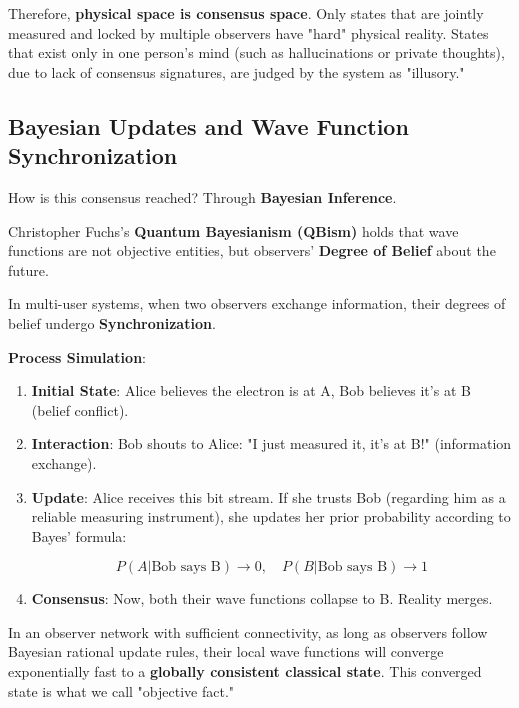Therefore, \textbf{physical space is consensus space}. Only states that are jointly measured and locked by multiple observers have "hard" physical reality. States that exist only in one person's mind (such as hallucinations or private thoughts), due to lack of consensus signatures, are judged by the system as "illusory."

\subsection{Bayesian Updates and Wave Function Synchronization}

How is this consensus reached? Through \textbf{Bayesian Inference}.

Christopher Fuchs's \textbf{Quantum Bayesianism (QBism)} holds that wave functions are not objective entities, but observers' \textbf{Degree of Belief} about the future.

In multi-user systems, when two observers exchange information, their degrees of belief undergo \textbf{Synchronization}.

\textbf{Process Simulation}:

\begin{enumerate}
\item \textbf{Initial State}: Alice believes the electron is at A, Bob believes it's at B (belief conflict).

\item \textbf{Interaction}: Bob shouts to Alice: "I just measured it, it's at B!" (information exchange).

\item \textbf{Update}: Alice receives this bit stream. If she trusts Bob (regarding him as a reliable measuring instrument), she updates her prior probability according to Bayes' formula:

    \begin{equation}
    P(A|\text{Bob says B}) \to 0, \quad P(B|\text{Bob says B}) \to 1
    \end{equation}

\item \textbf{Consensus}: Now, both their wave functions collapse to B. Reality merges.
\end{enumerate}

\begin{theorem}
In an observer network with sufficient connectivity, as long as observers follow Bayesian rational update rules, their local wave functions will converge exponentially fast to a \textbf{globally consistent classical state}. This converged state is what we call "objective fact."
\end{theorem}

